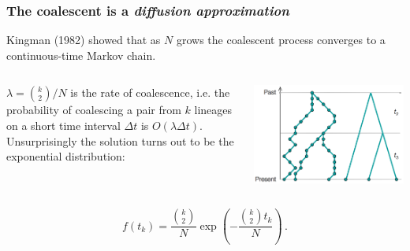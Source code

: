 





\begin{frame}
\frametitle{The coalescent is a \emph{diffusion approximation}}

Kingman (1982) showed that as $N$ grows the coalescent process converges to a
continuous-time Markov chain.

\medskip
\begin{columns}[t]


$\lambda = \binom{k}{2}/N$ is the rate of coalescence, i.e. the probability of coalescing a pair from $k$ lineages on a short time
interval $\Delta t$ is $O({\lambda\Delta t})$. Unsurprisingly the solution turns
out to be the exponential distribution:


\includegraphics[scale=0.18]{../images/wrightFisherToTree}


\end{columns}

\bigskip

\begin{equation*}
f(t_k)=\frac{{k \choose 2}}{N}\exp\left(-\frac{{k \choose 2}t_k}{N}\right)\,.
\end{equation*}

\end{frame}

